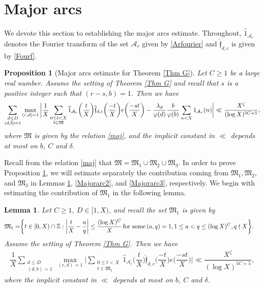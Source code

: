 \documentclass[12pt]{amsart}
\numberwithin{equation}{section}
\newtheorem{lemma}[theorem]{Lemma}
\newtheorem{prop}[theorem]{Proposition}
\theoremstyle{remark}
\theoremstyle{definition}
\begin{document}
\section{Major arcs}\label{sec: maj}
We devote this section to establishing the major arcs estimate. Throughout, $\widehat{1}_{\mathcal{A}_r}$ denotes the Fourier transform of the set $\mathcal{A}_r$ given by \eqref{Arfourier} and $\widehat{\mathfrak{f}}_{d, c}$ is given by \eqref{Fourf}. 
\begin{prop}[Major arcs estimate for Theorem \ref{Thm G}]\label{PropMajArc}
Let $C\geq 1$ be a large real number. Assume the setting of Theorem \ref{Thm G} and recall that $s$ is a positive integer such that $(r-s, b)=1$. Then we have
\begin{align}
\notag \sum_{\substack{d\leq D\\(d, b)=1}}\max_{(c, d)=1}\bigg\lvert\dfrac{1}{X}\sum_{\substack{0\leq t<X\\t\in \mathfrak{M}}}\widehat{1}_{\mathcal{A}_r}\bigg(\dfrac{t}{X}\bigg)\widehat{\mathfrak{f}}_{d, c}\bigg(\dfrac{-t}{X}\bigg)e\bigg(\dfrac{-st}{X}\bigg)-\dfrac{\lambda_{d}}{\varphi(d)}\dfrac{b}{\varphi(b)}\sum_{\substack{n< X}}1_{\mathcal{A}_r}(n)\bigg| \ll\dfrac{X^{\zeta}}{(\log X)^{5C+5}},
\end{align}
where $\mathfrak{M}$ is given by the relation \eqref{maj}, and the implicit constant in $\ll$ depends at most on $b$, $C$ and $\delta$.

\end{prop}

Recall from the relation \eqref{maj} that $\mathfrak{M} = \mathfrak{M}_1\cup \mathfrak{M}_2\cup \mathfrak{M}_3$. In order to prove Proposition \ref{PropMajArc}, we will estimate separately the contribution coming from $\mathfrak{M}_1, \mathfrak{M_2},$ and $\mathfrak{M}_3$ in Lemmas \ref{Majorarc1}, \ref{Majorarc2}, and \ref{Majorarc3}, respectively. We begin with estimating the contribution of $\mathfrak{M}_1$ in the following lemma.


\begin{lemma}\label{Majorarc1} Let $C\geq 1$, $D\in [1, X)$, and recall the set $\mathfrak{M}_1$ is given by
\begin{align}
\notag \mathfrak{M}_1 =&\bigg\{t \in [0, X)\cap \mathbb{Z}: \bigg\lvert\dfrac{t}{X}-\dfrac{a}{q}\bigg\rvert \leq \dfrac{(\log X)^C}{X}\, \text{for some}\, (a, q)=1, 1\leq a<q \leq (\log X)^C, q\nmid X\bigg\}.
\end{align}
Assume the setting of Theorem \ref{Thm G}. Then we have
\begin{align}\label{Majorarceq1}
\dfrac{1}{X}\sum_{\substack{d\leq D\\(d, b)=1}}\max_{(c,d)=1}\bigg\lvert
\sum_{\substack{0\leq t<X\\t\in \mathfrak{M}_1}}\widehat{1}_{\mathcal{A}_r}\bigg(\dfrac{t}{X}\bigg)\widehat{\mathfrak{f}}_{d, c}\bigg(\dfrac{-t}{X}\bigg)e\bigg(\dfrac{-st}{X}\bigg)\bigg\rvert \ll \dfrac{X^{\zeta}}{(\log X)^{5C+5}},
\end{align}
where the implicit constant in $\ll$ depends at most on $b$, $C$ and $\delta$.
\end{lemma}
\end{document}
